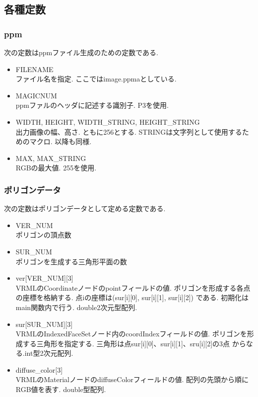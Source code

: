 \documentclass[a4j,dvipdfmx]{jsarticle}
\begin{document}
\subsection{各種定数}
\subsubsection{ppm}
次の定数はppmファイル生成のための定数である.
\begin{itemize}
\item FILENAME\\
  ファイル名を指定. ここではimage.ppmaとしている.
  
\item MAGICNUM\\
  ppmファルのヘッダに記述する識別子. P3を使用.
  
\item WIDTH, HEIGHT, WIDTH\_STRING, HEIGHT\_STRING\\
  出力画像の幅、高さ. ともに256とする. STRINGは文字列として使用するためのマクロ.
  以降も同様.
  
\item MAX, MAX\_STRING\\
  RGBの最大値. 255を使用.

\end{itemize}

\subsubsection{ポリゴンデータ}
次の定数はポリゴンデータとして定める定数である.
\begin{itemize}
\item VER\_NUM\\
  ポリゴンの頂点数
  
\item SUR\_NUM\\
  ポリゴンを生成する三角形平面の数
  
\item ver[VER\_NUM][3]\\
  VRMLのCoordinateノードのpointフィールドの値.
  ポリゴンを形成する各点の座標を格納する.
  点iの座標は(sur[i][0], sur[i][1], sur[i][2])
  である. 初期化はmain関数内で行う.
  double2次元型配列.
  
\item sur[SUR\_NUM][3]\\
  VRMLのIndexedFaceSetノード内のcoordIndexフィールドの値.
  ポリゴンを形成する三角形を指定する.
  三角形は点sur[i][0]、sur[i][1]、sru[i][2]の3点
  からなる.int型2次元配列.
  
\item diffuse\_color[3]\\
  VRMLのMaterialノードのdiffuseColorフィールドの値.
  配列の先頭から順にRGB値を表す.
  double型配列.
\end{itemize}
\end{document}
